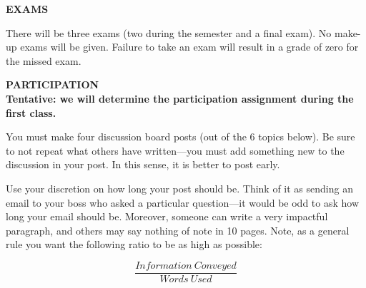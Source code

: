 \documentclass{article}
\begin{document}
\begin{center}
{\bf EXAMS} 
\end{center}
There will be three exams (two during the semester and a final exam). No make-up exams will be given.  Failure to take an exam will result in a grade of zero for the missed exam.  
\begin{center}
  {\bf PARTICIPATION}\\
    {\bf Tentative: we will determine the participation assignment during the first class.}
\end{center}
You must make four discussion board posts (out of the 6 topics below).  Be sure to not repeat what others have written---you must add something new to the discussion in your post.  In this sense, it is better to post early.

Use your discretion on how long your post should be. Think of it as sending an email to your boss who asked a particular question---it would be odd to ask how long your email should be.  Moreover, someone can write a very impactful paragraph, and others may say nothing of note in 10 pages. Note, as a general rule you want the following ratio to be as high as possible:

$$\frac{Information\ Conveyed}{Words\ Used}$$
\end{document}
